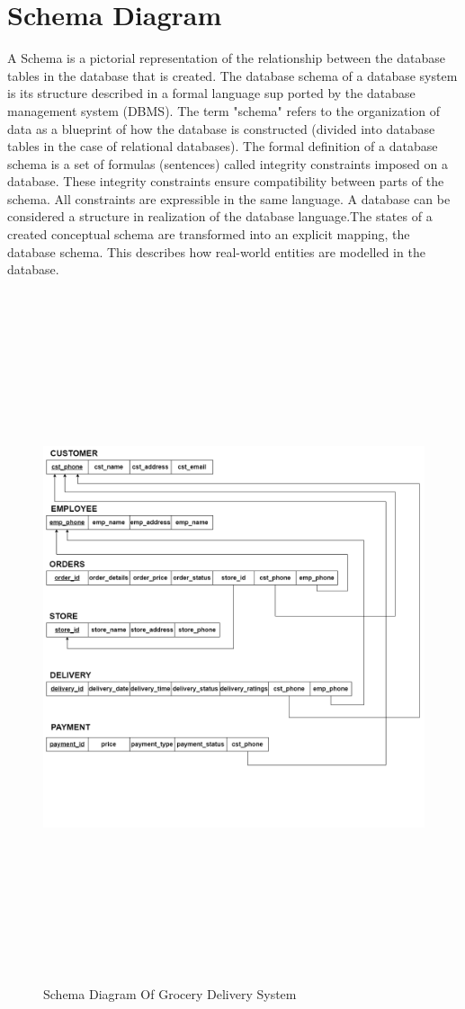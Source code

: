 \documentclass[12pt,a4paper]{report}
\begin{document}
\section{Schema Diagram}
\par
A Schema is a pictorial representation of the relationship between the database tables in the database that is created. The database schema of a database system is its structure described in a formal language sup ported by the database management system (DBMS). The term "schema" refers to the organization of data as a blueprint of how the database is constructed (divided into database tables in the case of relational databases). The formal definition of a database schema is a set of formulas (sentences) called integrity constraints imposed on a database. These integrity constraints ensure compatibility between parts of the schema. All constraints are expressible in the same language. A database can be considered a structure in realization of the database language.The states of a created conceptual schema are transformed into an explicit mapping, the database schema. This describes how real-world entities are modelled in the database.
\newpage
\begin{figure}[hbtp]
\centering
\includegraphics[width=6in,height=8in]{../fig/proper schema}
\caption{Schema Diagram Of Grocery Delivery System}
\end{figure}
\end{document}
